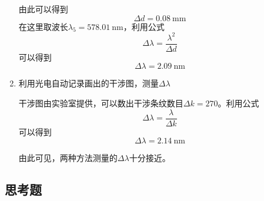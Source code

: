 \documentclass[a4paper]{article}
\begin{document}
\begin{changemargin}{1cm}{1cm}
\begin{spacing}{1.6}
\begin{enumerate}
              由此可以得到
              $$\Delta d=\SI{0.08}{\mm}$$
              在这里取波长$\lambda_5=\SI{578.01}{\nm}$，利用公式
              $$\Delta\lambda=\frac{\lambda^2}{\Delta d}$$
              可以得到
              $$\Delta\lambda=\SI{2.09}{\nm}$$

        \item 	利用光电自动记录画出的干涉图，测量$\Delta\lambda$

              干涉图由实验室提供，可以数出干涉条纹数目$\Delta k=270$。利用公式
              $$\Delta\lambda=\frac{\lambda}{\Delta k}$$
              可以得到
              $$\Delta\lambda=\SI{2.14}{\nm}$$

              由此可见，两种方法测量的$\Delta\lambda$十分接近。
    \end{enumerate}
\end{spacing}

\subsection{思考题}










\end{changemargin}
\end{document}
